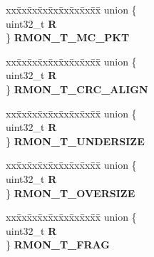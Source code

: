 \begin{DoxyCompactItemize}
\begin{tabbing}
\end{tabbing}\item 
\mbox{\label{structFEC__tag_a776c8625fca57b7ea8cea490e97dc250}} 
\begin{tabbing}
xx\=xx\=xx\=xx\=xx\=xx\=xx\=xx\=xx\=\kill
union \{\\
\>uint32\_t {\bfseries R}\\
\} {\bfseries RMON\_T\_MC\_PKT}\\

\end{tabbing}\item 
\mbox{\label{structFEC__tag_ac42a2b74997e7e0215e832836c467a7b}} 
\begin{tabbing}
xx\=xx\=xx\=xx\=xx\=xx\=xx\=xx\=xx\=\kill
union \{\\
\>uint32\_t {\bfseries R}\\
\} {\bfseries RMON\_T\_CRC\_ALIGN}\\

\end{tabbing}\item 
\mbox{\label{structFEC__tag_a1ee3342636ef161fd6e0aab239e2cb24}} 
\begin{tabbing}
xx\=xx\=xx\=xx\=xx\=xx\=xx\=xx\=xx\=\kill
union \{\\
\>uint32\_t {\bfseries R}\\
\} {\bfseries RMON\_T\_UNDERSIZE}\\

\end{tabbing}\item 
\mbox{\label{structFEC__tag_a7f009a34a25208f4b0d2312a55927a60}} 
\begin{tabbing}
xx\=xx\=xx\=xx\=xx\=xx\=xx\=xx\=xx\=\kill
union \{\\
\>uint32\_t {\bfseries R}\\
\} {\bfseries RMON\_T\_OVERSIZE}\\

\end{tabbing}\item 
\mbox{\label{structFEC__tag_ad982a4819ae3a1a0e55aafb33b603d46}} 
\begin{tabbing}
xx\=xx\=xx\=xx\=xx\=xx\=xx\=xx\=xx\=\kill
union \{\\
\>uint32\_t {\bfseries R}\\
\} {\bfseries RMON\_T\_FRAG}\\


\end{tabbing}
\end{DoxyCompactItemize}
